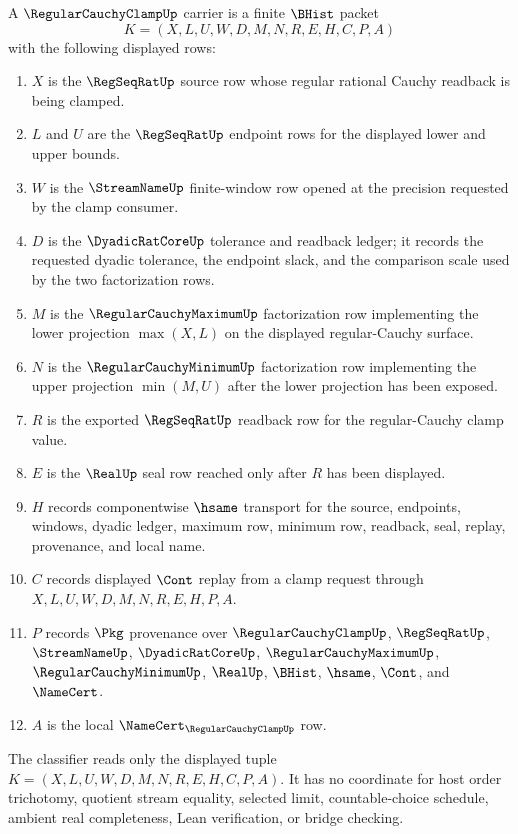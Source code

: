 \begin{definition}
\label{def:regular-cauchy-clamp-carrier}
A $\RegularCauchyClampUp$ carrier is a finite $\BHist$ packet
$$
K=(X,L,U,W,D,M,N,R,E,H,C,P,A)
$$
with the following displayed rows:
\begin{enumerate}
\item $X$ is the $\RegSeqRatUp$ source row whose regular rational Cauchy readback is being clamped.
\item $L$ and $U$ are the $\RegSeqRatUp$ endpoint rows for the displayed lower and upper bounds.
\item $W$ is the $\StreamNameUp$ finite-window row opened at the precision requested by the clamp consumer.
\item $D$ is the $\DyadicRatCoreUp$ tolerance and readback ledger; it records the requested dyadic tolerance, the endpoint slack, and the comparison scale used by the two factorization rows.
\item $M$ is the $\RegularCauchyMaximumUp$ factorization row implementing the lower projection $\max(X,L)$ on the displayed regular-Cauchy surface.
\item $N$ is the $\RegularCauchyMinimumUp$ factorization row implementing the upper projection $\min(M,U)$ after the lower projection has been exposed.
\item $R$ is the exported $\RegSeqRatUp$ readback row for the regular-Cauchy clamp value.
\item $E$ is the $\RealUp$ seal row reached only after $R$ has been displayed.
\item $H$ records componentwise $\hsame$ transport for the source, endpoints, windows, dyadic ledger, maximum row, minimum row, readback, seal, replay, provenance, and local name.
\item $C$ records displayed $\Cont$ replay from a clamp request through $X,L,U,W,D,M,N,R,E,H,P,A$.
\item $P$ records $\Pkg$ provenance over $\RegularCauchyClampUp$, $\RegSeqRatUp$, $\StreamNameUp$, $\DyadicRatCoreUp$, $\RegularCauchyMaximumUp$, $\RegularCauchyMinimumUp$, $\RealUp$, $\BHist$, $\hsame$, $\Cont$, and $\NameCert$.
\item $A$ is the local $\NameCert_{\RegularCauchyClampUp}$ row.
\end{enumerate}
The classifier reads only the displayed tuple $K=(X,L,U,W,D,M,N,R,E,H,C,P,A)$. It has no coordinate for host order trichotomy, quotient stream equality, selected limit, countable-choice schedule, ambient real completeness, Lean verification, or bridge checking.
\end{definition}

